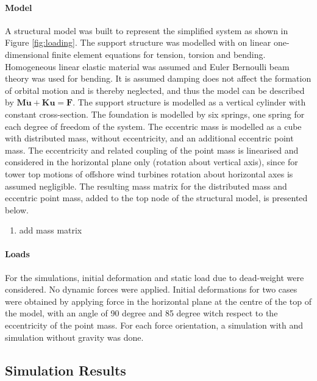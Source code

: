 \documentclass{article}
\begin{document}
\paragraph{Model}
A structural model was built to represent the simplified system as shown in Figure \ref{fig:loading}. The support structure was modelled with on linear one-dimensional finite element equations for tension, torsion and bending. Homogeneous linear elastic material was assumed and Euler Bernoulli beam theory was used for bending. It is assumed damping does not affect the formation of orbital motion and is thereby neglected, and thus the model can be described by \( \mathbf{M}\ddot{\mathbf{u}}+\mathbf{K}\mathbf{u} = \mathbf{F} \).
The support structure is modelled as a vertical cylinder with constant cross-section. The foundation is modelled by six springs, one spring for each degree of freedom of the system. The eccentric mass is modelled as a cube with distributed mass, without eccentricity, and an additional eccentric point mass. The eccentricity and related coupling of the point mass is linearised and considered in the horizontal plane only (rotation about vertical axis), since for tower top motions of offshore wind turbines rotation about horizontal axes is assumed negligible. The resulting mass matrix for the distributed mass and eccentric point mass, added to the top node of the structural model, is presented below.
\begin{enumerate}
    \item add mass matrix
\end{enumerate}

\paragraph{Loads}
For the simulations, initial deformation and static load due to dead-weight were considered. No dynamic forces were applied. Initial deformations for two cases were obtained by applying force in the horizontal plane at the centre of the top of the model, with an angle of 90 degree and 85 degree witch respect to the eccentricity of the point mass. For each force orientation, a simulation with and simulation without gravity was done. 


\subsection{Simulation Results}
\end{document}
